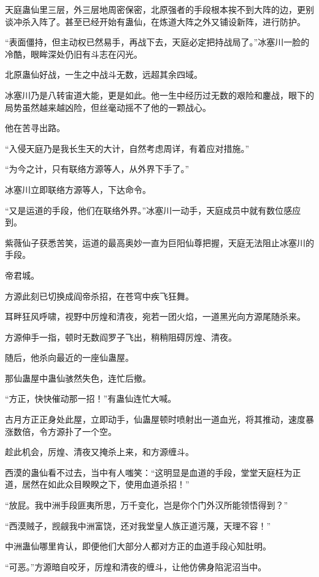 \begin{this_body}
天庭蛊仙里三层，外三层地周密保密，北原强者的手段根本挨不到大阵的边，更别谈冲杀入阵了。甚至已经开始有蛊仙，在炼道大阵之外又铺设新阵，进行防护。

“表面僵持，但主动权已然易手，再战下去，天庭必定把持战局了。”冰塞川一脸的冷酷，眼眸深处仍旧有斗志在闪光。

北原蛊仙好战，一生之中战斗无数，远超其余四域。

冰塞川乃是八转宙道大能，更是如此。他一生中经历过无数的艰险和鏖战，眼下的局势虽然越来越凶险，但丝毫动摇不了他的一颗战心。

他在苦寻出路。

“入侵天庭乃是我长生天的大计，自然考虑周详，有着应对措施。”

“为今之计，只有联络方源等人，从外界下手了。”

冰塞川立即联络方源等人，下达命令。

“又是运道的手段，他们在联络外界。”冰塞川一动手，天庭成员中就有数位感应到。

紫薇仙子获悉苦笑，运道的最高奥妙一直为巨阳仙尊把握，天庭无法阻止冰塞川的手段。

帝君城。

方源此刻已切换成阎帝杀招，在苍穹中疾飞狂舞。

耳畔狂风呼啸，视野中厉煌和清夜，宛若一团火焰，一道黑光向方源尾随杀来。

方源伸手一指，顿时无数阎罗子飞出，稍稍阻碍厉煌、清夜。

随后，他杀向最近的一座仙蛊屋。

那仙蛊屋中蛊仙骇然失色，连忙后撤。

“方正，快快催动那一招！”有蛊仙连忙大喊。

古月方正正身处此屋，立即动手，仙蛊屋顿时喷射出一道血光，将其推动，速度暴涨数倍，令方源扑了一个空。

趁此机会，厉煌、清夜又掩杀上来，和方源缠斗。

西漠的蛊仙看不过去，当中有人嗤笑：“这明显是血道的手段，堂堂天庭枉为正道，居然在如此众目睽睽之下，使用血道杀招！”

“放屁。我中洲手段匪夷所思，万千变化，岂是你个门外汉所能领悟得到？”

“西漠贼子，觊觎我中洲富饶，还对我堂皇人族正道污蔑，天理不容！”

中洲蛊仙哪里肯认，即便他们大部分人都对方正的血道手段心知肚明。

“可恶。”方源暗自咬牙，厉煌和清夜的缠斗，让他仿佛身陷泥沼当中。


\end{this_body}
